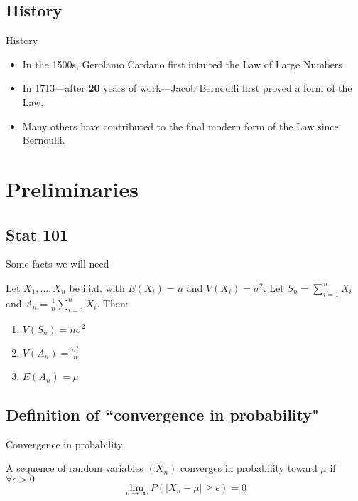 \documentclass[9pt]{beamer}
\begin{document}
\subsection{History}
\begin{frame}{History}

\begin{itemize}

\item In the 1500s, Gerolamo Cardano first intuited the Law of Large Numbers
\item In 1713—after \textbf{20} years of work—Jacob Bernoulli first proved a form of the Law.
\item Many others have contributed to the final modern form of the Law since Bernoulli.

\end{itemize}

\end{frame}

\section{Preliminaries}

\subsection{Stat 101}

\begin{frame}{Some facts we will need}

Let $X_{1},\ldots,X_{n}$ be i.i.d. with $E(X_{i})=\mu$ and $V(X_{i})=\sigma^{2}$. Let $S_{n}=\sum_{i=1}^{n}X_{i}$ and $A_{n}=\frac{1}{n}\sum_{i=1}^{n}X_{i}$. \pause Then: 
\begin{enumerate}
  \item $V(S_{n})=n\sigma^{2}$\pause
  \item $V(A_{n})=\frac{\sigma^{2}}{n}$\pause 
  \item $E(A_{n})=\mu$
\end{enumerate}

\end{frame}

\subsection{Definition of ``convergence in probability"}


\begin{frame}{Convergence in probability}

A sequence of random variables $(X_{n})$ converges in probability toward $\mu$ if $\forall \epsilon>0$
\[ \lim_{n\rightarrow \infty}P\left( \left| X_{n}-\mu \right|\geq \epsilon \right) = 0 \]

\end{frame}
\end{document}
